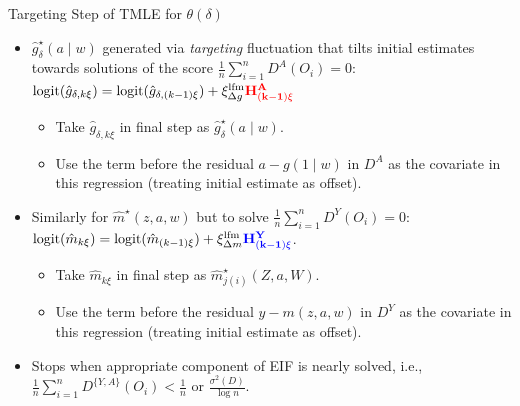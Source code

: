 \documentclass{beamer}
\begin{document}

\begin{frame}[c]{Targeting Step of TMLE for $\theta(\delta)$}

\begin{center}
\begin{itemize}
  \itemsep6pt
  \item $\hat{g}_{\delta}^{\star}(a \mid w)$ generated via \textit{targeting}
    fluctuation that tilts initial estimates towards solutions of the score
    $\frac{1}{n}\sum_{i=1}^n D^A(O_i) = 0$:
    $\text{logit}(\hat{g}_{\delta,k\xi}) =
    \text{logit}(\hat{g}_{\delta,(k-1)\xi}) + \xi_{\Delta g}^{\text{lfm}}
    \mathbf{\textcolor{red}{H^A_{(k-1)\xi}}}$
    \begin{itemize}
      \itemsep4pt
      \item Take $\hat{g}_{\delta,k\xi}$ in final step as
        $\hat{g}_{\delta}^{\star}(a \mid w)$.
      \item Use the term before the residual $a - g(1 \mid w)$ in $D^A$ as the
        covariate in this regression (treating initial estimate as offset).
    \end{itemize}
  \item Similarly for $\hat{m}^{\star}(z,a,w)$ but to solve
    $\frac{1}{n}\sum_{i=1}^n D^Y(O_i) = 0$:
    $\text{logit}(\hat{m}_{k\xi}) = \text{logit}(\hat{m}_{(k-1)\xi}) +
    \xi_{\Delta m}^{\text{lfm}}
    \mathbf{\textcolor{blue}{H^Y_{(k-1)\xi}}}$.
    \begin{itemize}
      \itemsep4pt
      \item Take $\hat{m}_{k\xi}$ in final step as
        $\hat{m}^{\star}_{j(i)}(Z, a, W)$.
      \item Use the term before the residual $y - m(z,a,w)$ in $D^Y$ as the
        covariate in this regression (treating initial estimate as offset).
  \end{itemize}
  \item Stops when appropriate component of EIF is nearly solved, i.e.,
    $\frac{1}{n}\sum_{i=1}^n D^{\{Y, A\}}(O_i) < \frac{1}{n}$ or
    $\frac{\sigma^2(D)}{\log n}$.
\end{itemize}
\end{center}

\note{
}

\end{frame}
\end{document}
